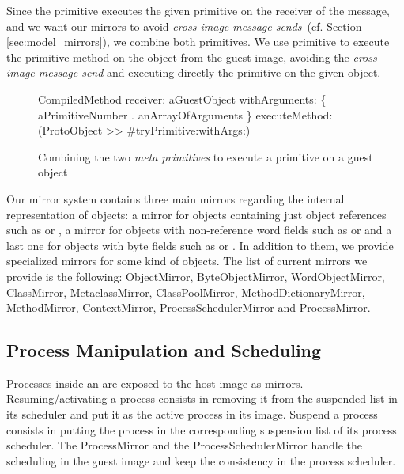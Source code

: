 Since the primitive  executes the given primitive on the receiver of the message, and we want our mirrors to avoid \emph{cross image-message sends}~(cf. Section \ref{sec:model_mirrors}), we combine both primitives. We use primitive  to execute the primitive method  on the object from the guest image, avoiding the \emph{cross image-message send} and executing directly the primitive on the given object.

\begin{figure}[htb]
\begin{code}
CompiledMethod
       receiver: aGuestObject
       withArguments: \{ aPrimitiveNumber . anArrayOfArguments \}
       executeMethod: (ProtoObject >> #tryPrimitive:withArgs:)
\end{code}
\caption{Combining the two \emph{meta primitives} to execute a primitive on a guest object\label{code:meta_primitives}}
\end{figure}

Our mirror system contains three main mirrors regarding the internal representation of objects: a mirror for objects containing just object references such as  or , a mirror for objects with non-reference word fields such as  or  and a last one for objects with byte fields such as  or . In addition to them, we provide specialized mirrors for some kind of objects. The list of current mirrors we provide is the following: ObjectMirror, ByteObjectMirror, WordObjectMirror, ClassMirror, MetaclassMirror, ClassPoolMirror, MethodDictionaryMirror, MethodMirror, ContextMirror, ProcessSchedulerMirror and ProcessMirror.

\subsection{Process Manipulation and Scheduling}

Processes inside an \objectspace are exposed to the host image as mirrors. Resuming/activating a process consists in removing it from the suspended list in its scheduler and put it as the active process in its image. Suspend a process consists in putting the process in the corresponding suspension list of its process scheduler. The ProcessMirror and the ProcessSchedulerMirror handle the scheduling in the guest image and keep the consistency in the \objectspace process scheduler.

